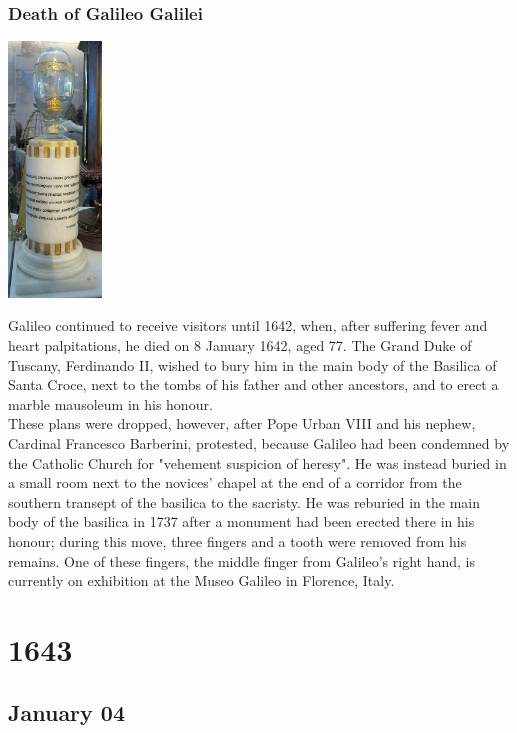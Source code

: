 \documentclass[11pt]{report}
\begin{document}
\subsection{Death of Galileo Galilei}
\vspace{2mm}\begin{center}\includegraphics[width=2.5cm]{./img/galileoMiddleFinger.jpg}\end{center}
Galileo continued to receive visitors until 1642, when, after suffering fever and heart palpitations, he died on 8 January 1642, aged 77. The Grand Duke of Tuscany, Ferdinando II, wished to bury him in the main body of the Basilica of Santa Croce, next to the tombs of his father and other ancestors, and to erect a marble mausoleum in his honour.\\
These plans were dropped, however, after Pope Urban VIII and his nephew, Cardinal Francesco Barberini, protested, because Galileo had been condemned by the Catholic Church for "vehement suspicion of heresy". He was instead buried in a small room next to the novices' chapel at the end of a corridor from the southern transept of the basilica to the sacristy. He was reburied in the main body of the basilica in 1737 after a monument had been erected there in his honour; during this move, three fingers and a tooth were removed from his remains. One of these fingers, the middle finger from Galileo's right hand, is currently on exhibition at the Museo Galileo in Florence, Italy.

\chapter{1643}
\section{January 04}
\end{document}
